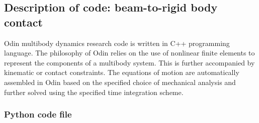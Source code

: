 \subsection{Description of code: beam-to-rigid body contact}
Odin multibody dynamics research code \cite{odin2022} is written in C++ programming language. The philosophy of Odin relies on the use of nonlinear finite elements to represent the components of a multibody system. This is further accompanied by kinematic or contact constraints. The equations of motion are automatically assembled in Odin based on the specified choice of mechanical analysis and further solved using the specified time integration scheme.\\

\subsubsection{Python code file} 
